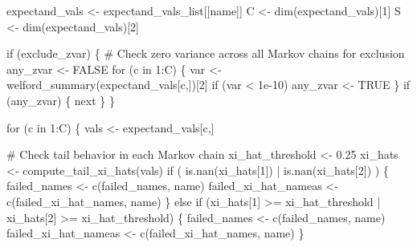 \documentclass[
  letterpaper,
  DIV=11,
  numbers=noendperiod]{scrartcl}
\newenvironment{Shaded}{\begin{snugshade}}{\end{snugshade}}
\newcommand{\BuiltInTok}[1]{\textcolor[rgb]{0.00,0.23,0.31}{#1}}
\newcommand{\CommentTok}[1]{\textcolor[rgb]{0.37,0.37,0.37}{#1}}
\newcommand{\ControlFlowTok}[1]{\textcolor[rgb]{0.00,0.23,0.31}{#1}}
\newcommand{\DecValTok}[1]{\textcolor[rgb]{0.68,0.00,0.00}{#1}}
\newcommand{\FloatTok}[1]{\textcolor[rgb]{0.68,0.00,0.00}{#1}}
\newcommand{\KeywordTok}[1]{\textcolor[rgb]{0.00,0.23,0.31}{#1}}
\newcommand{\NormalTok}[1]{\textcolor[rgb]{0.00,0.23,0.31}{#1}}
\newcommand{\OperatorTok}[1]{\textcolor[rgb]{0.37,0.37,0.37}{#1}}
\begin{document}
\begin{Shaded}
\begin{Highlighting}[]
\NormalTok{    expectand\_vals }\OperatorTok{\textless{}{-}}\NormalTok{ expectand\_vals\_list[[name]]}
\NormalTok{    C }\OperatorTok{\textless{}{-}}\NormalTok{ dim(expectand\_vals)[}\DecValTok{1}\NormalTok{]}
\NormalTok{    S }\OperatorTok{\textless{}{-}}\NormalTok{ dim(expectand\_vals)[}\DecValTok{2}\NormalTok{]}
    
    \ControlFlowTok{if}\NormalTok{ (exclude\_zvar) \{}
      \CommentTok{\# Check zero variance across all Markov chains for exclusion}
\NormalTok{      any\_zvar }\OperatorTok{\textless{}{-}}\NormalTok{ FALSE}
      \ControlFlowTok{for}\NormalTok{ (c }\KeywordTok{in} \DecValTok{1}\NormalTok{:C) \{}
\NormalTok{        var }\OperatorTok{\textless{}{-}}\NormalTok{ welford\_summary(expectand\_vals[c,])[}\DecValTok{2}\NormalTok{]}
        \ControlFlowTok{if}\NormalTok{ (var }\OperatorTok{\textless{}} \FloatTok{1e{-}10}\NormalTok{)}
\NormalTok{          any\_zvar }\OperatorTok{\textless{}{-}}\NormalTok{ TRUE}
\NormalTok{      \}}
      \ControlFlowTok{if}\NormalTok{ (any\_zvar) \{}
        \BuiltInTok{next}
\NormalTok{      \}}
\NormalTok{    \}}

    \ControlFlowTok{for}\NormalTok{ (c }\KeywordTok{in} \DecValTok{1}\NormalTok{:C) \{}
\NormalTok{      vals }\OperatorTok{\textless{}{-}}\NormalTok{ expectand\_vals[c,]}
      
      \CommentTok{\# Check tail behavior in each Markov chain}
\NormalTok{      xi\_hat\_threshold }\OperatorTok{\textless{}{-}} \FloatTok{0.25}
\NormalTok{      xi\_hats }\OperatorTok{\textless{}{-}}\NormalTok{ compute\_tail\_xi\_hats(vals)}
      \ControlFlowTok{if}\NormalTok{ ( }\KeywordTok{is}\NormalTok{.nan(xi\_hats[}\DecValTok{1}\NormalTok{]) }\OperatorTok{|} \KeywordTok{is}\NormalTok{.nan(xi\_hats[}\DecValTok{2}\NormalTok{]) ) \{}
\NormalTok{        failed\_names }\OperatorTok{\textless{}{-}}\NormalTok{ c(failed\_names, name)}
\NormalTok{        failed\_xi\_hat\_nameas }\OperatorTok{\textless{}{-}}\NormalTok{ c(failed\_xi\_hat\_names, name)}
\NormalTok{      \} }\ControlFlowTok{else} \ControlFlowTok{if}\NormalTok{ (xi\_hats[}\DecValTok{1}\NormalTok{] }\OperatorTok{\textgreater{}=}\NormalTok{ xi\_hat\_threshold }\OperatorTok{|} 
\NormalTok{                 xi\_hats[}\DecValTok{2}\NormalTok{] }\OperatorTok{\textgreater{}=}\NormalTok{ xi\_hat\_threshold) \{}
\NormalTok{        failed\_names }\OperatorTok{\textless{}{-}}\NormalTok{ c(failed\_names, name)}
\NormalTok{        failed\_xi\_hat\_nameas }\OperatorTok{\textless{}{-}}\NormalTok{ c(failed\_xi\_hat\_names, name)}
\NormalTok{      \}}
      

\end{Highlighting}
\end{Shaded}
\end{document}
